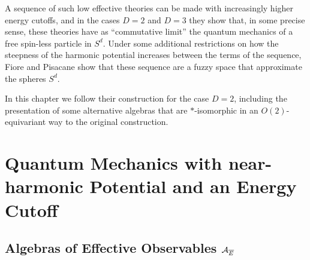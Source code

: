 A sequence of such low effective theories can be made with increasingly higher energy cutoffs, and in the cases $D = 2$ and $D = 3$ they show that, in some precise sense, these theories have as ``commutative limit'' the quantum mechanics of a free spin-less particle in $S^d$. Under some additional restrictions on how the steepness of the harmonic potential increases between the terms of the sequence, Fiore and Pisacane show that these sequence are a fuzzy space that approximate the spheres $S^d$.

In this chapter we follow their construction for the case $D = 2$, including the presentation of some alternative algebras that are $*$-isomorphic in an $O(2)$-equivariant way to the original construction.

\section{Quantum Mechanics with near-harmonic Potential and an Energy Cutoff}
\label{chNewFuzzySectionGeneralSeting}

    
    
    

\subsection{Algebras of Effective Observables $\mathcal{A}_{\overline{E}}$} 

